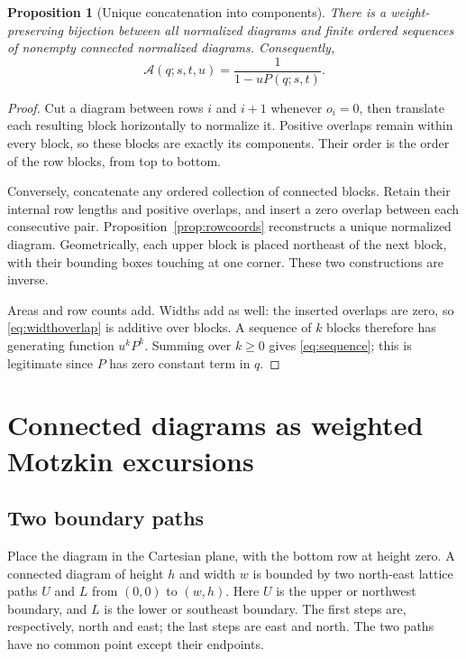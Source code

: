 \documentclass[11pt,letterpaper]{article}
\numberwithin{equation}{section}
\newtheorem{proposition}[theorem]{Proposition}
\theoremstyle{definition}
\newcommand{\Aall}{\mathcal A}
\begin{document}
\begin{proposition}[Unique concatenation into components]
\label{prop:sequence}
There is a weight-preserving bijection between all normalized diagrams and
finite ordered sequences of nonempty connected normalized diagrams.
Consequently,
\begin{equation}
 \Aall(q;s,t,u)=\frac{1}{1-uP(q;s,t)}.
 \label{eq:sequence}
\end{equation}
\end{proposition}
\begin{proof}
Cut a diagram between rows $i$ and $i+1$ whenever $o_i=0$, then translate
each resulting block horizontally to normalize it. Positive overlaps
remain within every block, so these blocks are exactly its components.
Their order is the order of the row blocks, from top to bottom.

Conversely, concatenate any ordered collection of connected blocks. Retain
their internal row lengths and positive overlaps, and insert a zero overlap
between each consecutive pair. Proposition~\ref{prop:rowcoords} reconstructs
a unique normalized diagram. Geometrically, each upper block is placed
northeast of the next block, with their bounding boxes touching at one
corner. These two constructions are inverse.

Areas and row counts add. Widths add as well: the inserted overlaps are
zero, so \eqref{eq:widthoverlap} is additive over blocks. A sequence of $k$
blocks therefore has generating function $u^kP^k$. Summing over $k\ge0$
gives \eqref{eq:sequence}; this is legitimate since $P$ has zero constant
term in $q$.
\end{proof}

\section{Connected diagrams as weighted Motzkin excursions}
\label{sec:paths}

\subsection{Two boundary paths}
Place the diagram in the Cartesian plane, with the bottom row at height
zero. A connected diagram of height $h$ and width $w$ is bounded by two
north-east lattice paths $U$ and $L$ from $(0,0)$ to $(w,h)$. Here $U$ is
the upper or northwest boundary, and $L$ is the lower or southeast boundary.
The first steps are, respectively, north and east; the last steps are east
and north. The two paths have no common point except their endpoints.
\end{document}
